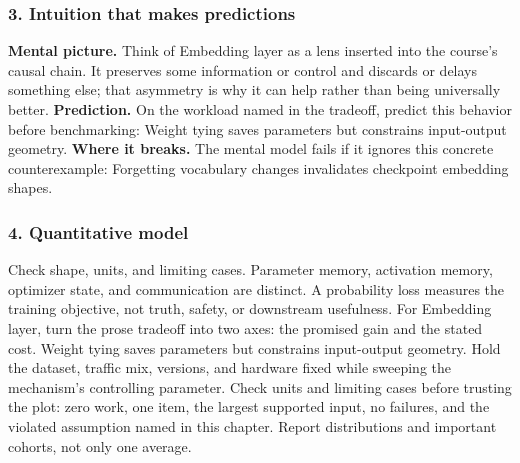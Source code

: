 \subsubsection*{3. Intuition that makes predictions}
\textbf{Mental picture.} Think of Embedding layer as a lens inserted into the course's causal chain. It preserves some information or control and discards or delays something else; that asymmetry is why it can help rather than being universally better.
\textbf{Prediction.} On the workload named in the tradeoff, predict this behavior before benchmarking: Weight tying saves parameters but constrains input-output geometry.
\textbf{Where it breaks.} The mental model fails if it ignores this concrete counterexample: Forgetting vocabulary changes invalidates checkpoint embedding shapes.
\subsubsection*{4. Quantitative model}
Check shape, units, and limiting cases. Parameter memory, activation memory, optimizer state, and communication are distinct. A probability loss measures the training objective, not truth, safety, or downstream usefulness.
For Embedding layer, turn the prose tradeoff into two axes: the promised gain and the stated cost. Weight tying saves parameters but constrains input-output geometry. Hold the dataset, traffic mix, versions, and hardware fixed while sweeping the mechanism's controlling parameter.
Check units and limiting cases before trusting the plot: zero work, one item, the largest supported input, no failures, and the violated assumption named in this chapter. Report distributions and important cohorts, not only one average.
